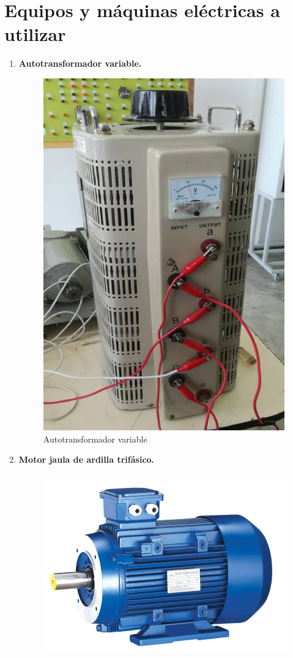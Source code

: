 \documentclass[a4paper,12pt]{article}
\begin{document}
\section{Equipos y máquinas eléctricas a utilizar}
\begin{enumerate}
    \item \textbf{Autotransformador variable.}
    \begin{figure}[H]
        \centering
        \includegraphics[scale=0.55]{autotransformador.png}
        \caption{Autotransformador variable}
    \end{figure}
    \item \textbf{Motor jaula de ardilla trifásico.}
    \begin{figure}[H]
        \centering
        \includegraphics[scale = 0.48]{ardilla.png}

\end{figure}
\end{enumerate}
\end{document}
